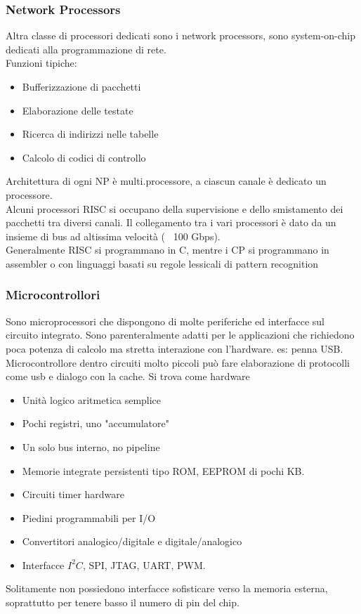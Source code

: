 \documentclass{article}
\begin{document}
\subsubsection{Network Processors}
Altra classe di processori dedicati sono i network processors, sono system-on-chip dedicati alla programmazione di rete.\\ Funzioni tipiche:
\begin{itemize}
\item Bufferizzazione di pacchetti
\item Elaborazione delle testate
\item Ricerca di indirizzi nelle tabelle
\item Calcolo di codici di controllo
\end{itemize}
Architettura di ogni NP è multi.processore, a ciascun canale è dedicato un processore.\\ Alcuni processori RISC si occupano della supervisione e dello smistamento dei pacchetti tra diversi canali. Il collegamento tra i vari processori è dato da un insieme di bus ad altissima velocità (~ 100 Gbps).\\ Generalmente RISC si programmano in C, mentre i CP si programmano in assembler o con linguaggi basati su regole lessicali di pattern recognition
\subsubsection{Microcontrollori}
Sono microprocessori che dispongono di molte periferiche ed interfacce sul circuito integrato. Sono parenteralmente adatti per le applicazioni che richiedono poca potenza di calcolo ma stretta interazione con l'hardware. es: penna USB. Microcontrollore dentro circuiti molto piccoli può fare elaborazione di protocolli come usb e dialogo con la cache. Si trova come hardware
\begin{itemize}
\item Unità logico aritmetica semplice
\item Pochi registri, uno "accumulatore"
\item Un solo bus interno, no pipeline
\item Memorie integrate persistenti tipo ROM, EEPROM di pochi KB.
\item Circuiti timer hardware
\item Piedini programmabili per I/O
\item Convertitori analogico/digitale e digitale/analogico
\item Interfacce $I^2C$, SPI, JTAG, UART, PWM.
\end{itemize}
Solitamente non possiedono interfacce sofisticare verso la memoria esterna, soprattutto per tenere basso il numero di pin del chip.
\end{document}
